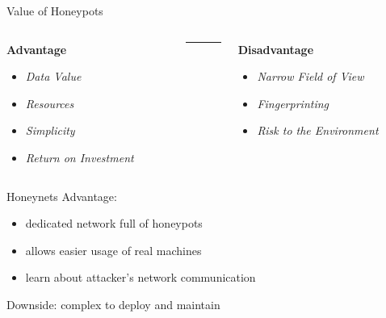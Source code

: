 \begin{frame}{Value of Honeypots}
    \begin{columns}[T]
        \begin{column}{0.49\textwidth}
            \begin{center}
                \textbf{Advantage}
            \end{center}
            \begin{itemize}
                \item \textit{Data Value}
                \item \textit{Resources}
                \item \textit{Simplicity}
                \item \textit{Return on Investment}
            \end{itemize}
        \end{column}
        \begin{column}{.02\textwidth}
            \rule{.1mm}{0.7\textheight}
        \end{column}
        \begin{column}{0.49\textwidth}
            \begin{center}
                \textbf{Disadvantage}
            \end{center}
            \begin{itemize}
                \item \textit{Narrow Field of View}
                \item \textit{Fingerprinting}
                \item \textit{Risk to the Environment}
            \end{itemize}
        \end{column}
    \end{columns}
\end{frame}

\begin{frame}{Honeynets}
    Advantage:
    \begin{itemize}
        \item dedicated network full of honeypots
        \item allows easier usage of real machines
        \item learn about attacker's network communication
    \end{itemize}
    Downside: complex to deploy and maintain
\end{frame}

